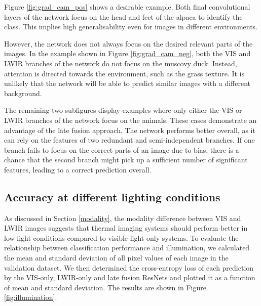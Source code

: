 \documentclass{l4proj}
\begin{document}
Figure \ref{fig:grad_cam_pos} shows a desirable example. Both final convolutional layers of the network focus on the head and feet of the alpaca to identify the class. This implies high generalisability even for images in different environments.

However, the network does not always focus on the desired relevant parts of the images. In the example shown in Figure \ref{fig:grad_cam_neg}, both the VIS and LWIR branches of the network do not focus on the muscovy duck. Instead, attention is directed towards the environment, such as the grass texture. It is unlikely that the network will be able to predict similar images with a different background.

The remaining two subfigures display examples where only either the VIS or LWIR branches of the network focus on the animals. These cases demonstrate an advantage of the late fusion approach. The network performs better overall, as it can rely on the features of two redundant and semi-independent branches. If one branch fails to focus on the correct parts of an image due to bias, there is a chance that the second branch might pick up a sufficient number of significant features, leading to a correct prediction overall. 


\subsection{Accuracy at different lighting conditions}

As discussed in Section \ref{modality}, the modality difference between VIS and LWIR images suggests that thermal imaging systems should perform better in low-light conditions compared to visible-light-only systems. To evaluate the relationship between classification performance and illumination, we calculated the mean and standard deviation of all pixel values of each image in the validation dataset. We then determined the cross-entropy loss of each prediction by the VIS-only, LWIR-only and late fusion ResNets and plotted it as a function of mean and standard deviation. The results are shown in Figure \ref{fig:illumination}.
\end{document}
